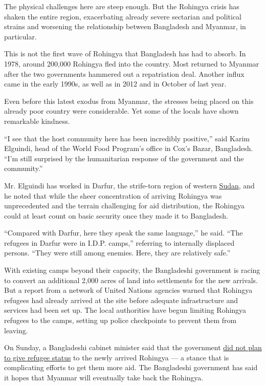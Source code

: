 The physical challenges here are steep enough. But the Rohingya crisis
has shaken the entire region, exacerbating already severe sectarian and
political strains and worsening the relationship between Bangladesh and
Myanmar, in particular.

This is not the first wave of Rohingya that Bangladesh has had to
absorb. In 1978, around 200,000 Rohingya fled into the country. Most
returned to Myanmar after the two governments hammered out a
repatriation deal. Another influx came in the early 1990s, as well as in
2012 and in October of last year.

Even before this latest exodus from Myanmar, the stresses being placed
on this already poor country were considerable. Yet some of the locals
have shown remarkable kindness.

``I see that the host community here has been incredibly positive,''
said Karim Elguindi, head of the World Food Program's office in Cox's
Bazar, Bangladesh. ``I'm still surprised by the humanitarian response of
the government and the community.''

Mr. Elguindi has worked in Darfur, the strife-torn region of western
\href{https://www.nytimes3xbfgragh.onion/topic/destination/sudan?inline=nyt-geo}{Sudan},
and he noted that while the sheer concentration of arriving Rohingya was
unprecedented and the terrain challenging for aid distribution, the
Rohingya could at least count on basic security once they made it to
Bangladesh.

``Compared with Darfur, here they speak the same language,'' he said.
``The refugees in Darfur were in I.D.P. camps,'' referring to internally
displaced persons. ``They were still among enemies. Here, they are
relatively safe.''

With existing camps beyond their capacity, the Bangladeshi government is
racing to convert an additional 2,000 acres of land into settlements for
the new arrivals. But a report from a network of United Nations agencies
warned that Rohingya refugees had already arrived at the site before
adequate infrastructure and services had been set up. The local
authorities have begun limiting Rohingya refugees to the camps, setting
up police checkpoints to prevent them from leaving.

On Sunday, a Bangladeshi cabinet minister said that the government
\href{http://www.dhakatribune.com/bangladesh/2017/09/24/amu-no-plan-give-refugee-status-rohingya/}{did
not plan to give refugee status} to the newly arrived Rohingya --- a
stance that is complicating efforts to get them more aid. The
Bangladeshi government has said it hopes that Myanmar will eventually
take back the Rohingya.

